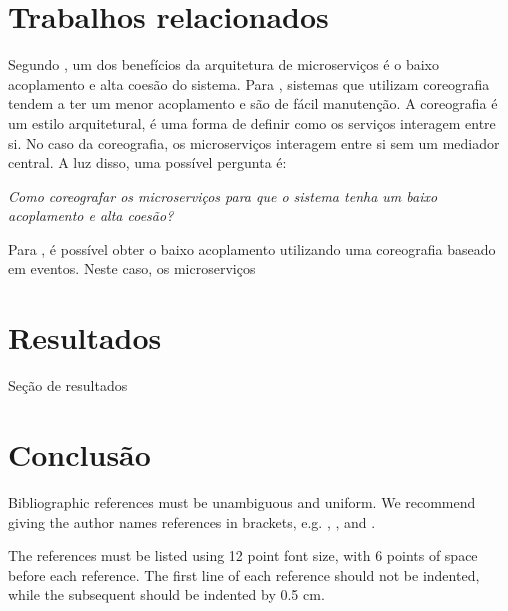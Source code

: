 \documentclass[12pt]{article}
\theoremstyle{plain}
\begin{document}
\section{Trabalhos relacionados}
\label{sec:trabalhos-relacionados}

Segundo \cite{wolf:2018}, um dos benefícios da arquitetura de microserviços é o baixo acoplamento e alta coesão do sistema. Para \cite{Newman:15}, sistemas que utilizam coreografia tendem a ter um menor acoplamento e são de fácil manutenção. A coreografia é um estilo arquitetural, é uma forma de definir como os serviços interagem entre si. No caso da coreografia, os microserviços interagem entre si sem um mediador central. A luz disso, uma possível pergunta é:

\emph{Como coreografar os microserviços para que o sistema tenha um baixo acoplamento e alta coesão?}

Para \cite{damore:2018}, é possível obter o baixo acoplamento utilizando uma coreografia baseado em eventos. Neste caso, os microserviços 



\section{Resultados}
\label{sec:resultados}

Seção de resultados

\section{Conclusão}
\label{sec:conclusao}

Bibliographic references must be unambiguous and uniform.  We recommend giving
the author names references in brackets, e.g. \cite{knuth:84},
\cite{boulic:91}, and \cite{smith:99}.

The references must be listed using 12 point font size, with 6 points of space
before each reference. The first line of each reference should not be
indented, while the subsequent should be indented by 0.5 cm.



\end{document}
